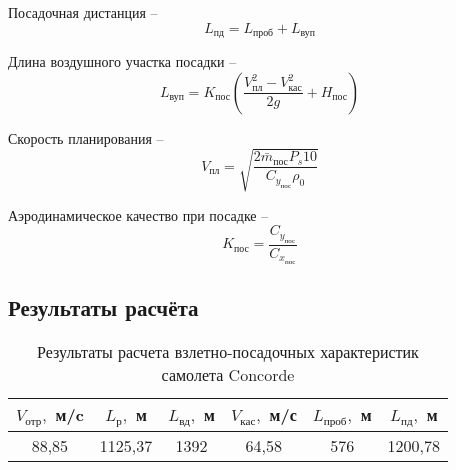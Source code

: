 Посадочная дистанция -- 
\begin{equation}
    \label{eq:Посадочная дистанция}
    L_\text{пд} = L_\text{проб} + L_\text{вуп}
\end{equation}

Длина воздушного участка посадки -- 
\begin{equation}
    \label{eq:Длина воздушного участка посадки}
        L_\text{вуп} = K_\text{пос}(\frac{V_\text{пл}^2-V^2_\text{кас}}{2g}+H_\text{пос})
\end{equation}
 
 Скорость планирования -- 
 \begin{equation}
     \label{eq:Скорость планирования}
     V_\text{пл} = \sqrt{\frac{2\bar{m}_\text{пос}P_s10}{C_{y_\text{пос}}\rho_0}}
 \end{equation}
 
 Аэродинамическое качество при посадке -- 
 \begin{equation}
     \label{eq:Аэродинамическое качество при посадке}
     K_\text{пос} = \frac{C_{y_\text{пос}}}{C_{x_\text{пос}}}
 \end{equation}
 
 \subsection{Результаты расчёта}
 
 \begin{table}[H]
     \centering
     \caption{Результаты расчета взлетно-посадочных характеристик самолета Concorde}
     \begin{tabular}{|c|c|c|c|c|c|}
     \hline
          $V_\text{отр}, $ м/c& $L_\text{р},$ м & $L_\text{вд},$ м& $V_\text{кас},$ м/с  &$L_\text{проб},$ м  &$L_\text{пд},$ м\\ \hline
          88,85& 1125,37 & 1392 & 64,58 & 576 &1200,78\\ \hline
     \end{tabular}
     \label{tab:my_label}
 \end{table}


  
